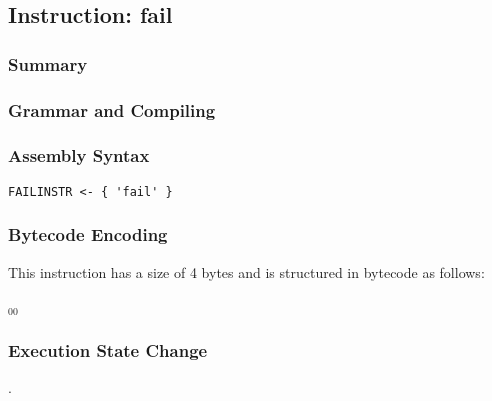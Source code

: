 \subsection{Instruction: fail}

\subsubsection{Summary}


\subsubsection{Grammar and Compiling}


\subsubsection{Assembly Syntax}

\begin{myquote}
\begin{verbatim}
FAILINSTR <- { 'fail' }
\end{verbatim}
\end{myquote}


\subsubsection{Bytecode Encoding}

This instruction has a size of 4 bytes and is structured in bytecode as follows:

$_{00}$\ 


\subsubsection{Execution State Change}

.


